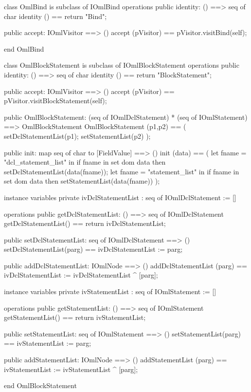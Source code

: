 \begin{vdm_al}
class OmlBind is subclass of IOmlBind
operations
  public identity: () ==> seq of char
  identity () == return "Bind";

  public accept: IOmlVisitor ==> ()
  accept (pVisitor) == pVisitor.visitBind(self);

end OmlBind
\end{vdm_al}
\begin{vdm_al}
class OmlBlockStatement is subclass of IOmlBlockStatement
operations
  public identity: () ==> seq of char
  identity () == return "BlockStatement";

  public accept: IOmlVisitor ==> ()
  accept (pVisitor) == pVisitor.visitBlockStatement(self);

  public OmlBlockStatement:
      (seq of IOmlDclStatement) *
      (seq of IOmlStatement) ==> OmlBlockStatement
  OmlBlockStatement (p1,p2) == 
   ( setDclStatementList(p1);
     setStatementList(p2) );

  public init: map seq of char to [FieldValue] ==> ()
  init (data) ==
    ( let fname = "dcl_statement_list" in
        if fname in set dom data
        then setDclStatementList(data(fname));
      let fname = "statement_list" in
        if fname in set dom data
        then setStatementList(data(fname)) );

instance variables
  private ivDclStatementList : seq of IOmlDclStatement := []

operations
  public getDclStatementList: () ==> seq of IOmlDclStatement
  getDclStatementList() == return ivDclStatementList;

  public setDclStatementList: seq of IOmlDclStatement ==> ()
  setDclStatementList(parg) == ivDclStatementList := parg;

  public addDclStatementList: IOmlNode ==> ()
  addDclStatementList (parg) == ivDclStatementList := ivDclStatementList ^ [parg];

instance variables
  private ivStatementList : seq of IOmlStatement := []

operations
  public getStatementList: () ==> seq of IOmlStatement
  getStatementList() == return ivStatementList;

  public setStatementList: seq of IOmlStatement ==> ()
  setStatementList(parg) == ivStatementList := parg;

  public addStatementList: IOmlNode ==> ()
  addStatementList (parg) == ivStatementList := ivStatementList ^ [parg];

end OmlBlockStatement
\end{vdm_al}

